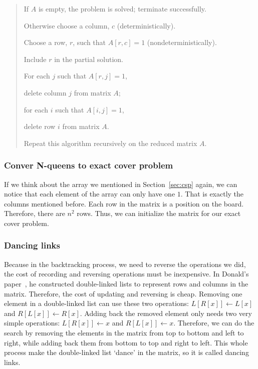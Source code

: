 \begin{quotation}
  If $A$ is empty, the problem is solved; terminate successfully.
  
  Otherwise choose a column, $c$ (deterministically).
  
  Choose a row, $r$, such that $A[r, c] = 1$ (nondeterministically).
  
  Include $r$ in the partial solution.
  
  For each $j$ such that $A[r, j] = 1$,
  
  \indent \indent  delete column $j$ from matrix $A$;
  
  \indent \indent  for each $i$ such that $A[i, j] = 1$,
  
  \indent \indent \indent     delete row $i$ from matrix $A$.
  
  Repeat this algorithm recursively on the reduced matrix $A$.
\end{quotation}

\subsubsection{Conver N-queens to exact cover problem}
If we think about the array we mentioned in Section~\ref{sec:csp} again, we can notice that each element of the array can only have one $1$. That is exactly the columns mentioned before. Each row in the matrix is a position on the board. Therefore, there are $n^2$ rows. Thus, we can initialize the matrix for our exact cover problem.

\subsubsection{Dancing links}\label{sec:dl}
Because in the backtracking process, we need to reverse the operations we did, the cost of recording and reversing operations must be inexpensive. In Donald's paper~\cite{knuth_dancing_2000}, he constructed double-linked lists to represent rows and columns in the matrix. Therefore, the cost of updating and reversing is cheap. Removing one element in a double-linked list can use these two operations: $L[R[x]]\leftarrow L[x]$ and $R[L[x]]\leftarrow R[x]$. Adding back the removed element only needs two very simple operations: $L[R[x]]\leftarrow x$ and $R[L[x]]\leftarrow x$.  Therefore, we can do the search by removing the elements in the matrix from top to bottom and left to right, while adding back them from bottom to top and right to left. This whole process make the double-linked list `dance' in the matrix, so it is called dancing links.

